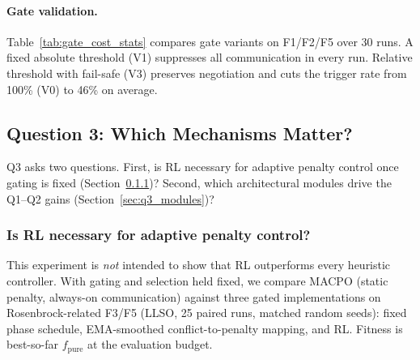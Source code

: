 \documentclass[conference]{IEEEtran}
\begin{document}
\paragraph{Gate validation.}\label{sec:gate_validation}
Table~\ref{tab:gate_cost_stats} compares gate variants on F1/F2/F5 over 30 runs. A fixed absolute threshold (V1) suppresses all communication in every run. Relative threshold with fail-safe (V3) preserves negotiation and cuts the trigger rate from 100\% (V0) to 46\% on average.

\begin{table}[!t]
\centering
\scriptsize
\caption{Gate-variant comparison on F1/F2/F5. Purpose: validate relative-threshold gating. Setting: 30 runs, LLSO. Metrics: communication trigger rate and wall time. Statistics: mean$\pm$std.}
\label{tab:gate_cost_stats}
\setlength{\tabcolsep}{3pt}
\end{table}

\subsection{Question 3: Which Mechanisms Matter?}\label{sec:exp_q3}
Q3 asks two questions. First, is RL necessary for adaptive penalty control once gating is fixed (Section~\ref{sec:q3_penalty})? Second, which architectural modules drive the Q1--Q2 gains (Section~\ref{sec:q3_modules})?

\subsubsection{Is RL necessary for adaptive penalty control?}\label{sec:q3_penalty}
This experiment is \emph{not} intended to show that RL outperforms every heuristic controller. With gating and selection held fixed, we compare MACPO (static penalty, always-on communication) against three gated implementations on Rosenbrock-related F3/F5 (LLSO, 25 paired runs, matched random seeds): fixed phase schedule, EMA-smoothed conflict-to-penalty mapping, and RL. Fitness is best-so-far $f_{\mathrm{pure}}$ at the evaluation budget.
\end{document}
